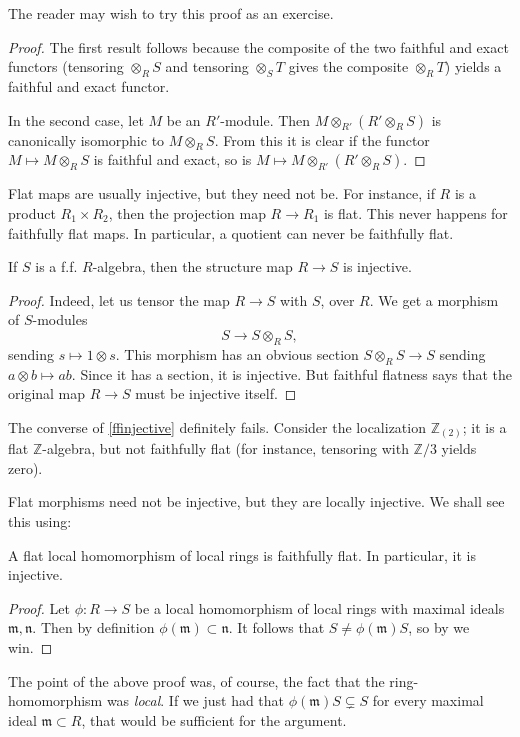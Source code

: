 The reader may wish to try this proof as an exercise.
\begin{proof} 
The first result follows because the composite of the two faithful and exact
functors (tensoring  $ \otimes_R S$ and tensoring  $ \otimes_S T$ gives the
composite $\otimes_R T$) yields a faithful and exact functor. 

In the second case, let $M$ be an $R'$-module. Then $M \otimes_{R'} (R'
\otimes_R S)$ is canonically isomorphic to $M \otimes_R S$. From this it is
clear if the functor $M \mapsto M \otimes_R S$ is faithful and
exact, so is 
$M \mapsto M \otimes_{R'} (R'
\otimes_R S)$.
\end{proof} 

Flat maps are usually injective, but they need not be. For instance, if $R$ is a
product $R_1 \times R_2$, then the projection map $R \to R_1$ is flat.
This never happens for faithfully flat maps.
In particular, a quotient can never be faithfully flat.

\begin{proposition}  \label{ffinjective}
If $S$ is a f.f. $R$-algebra, then the structure map $R \to S$ is injective.
\end{proposition} 
\begin{proof} 
Indeed, let us tensor the map $R \to S $ with $S$, over $R$. We get a morphism
of $S$-modules
\[ S \to S \otimes_R S ,  \]
sending $s \mapsto  1 \otimes s$.
This morphism has an obvious section $S \otimes_R S \to S$ sending $a \otimes b
\mapsto ab$. Since it has a section, it is injective. But faithful flatness says
that the original map $R \to S$ must be injective itself.
\end{proof} 

\begin{example} 
The converse of \cref{ffinjective} definitely fails. Consider the localization $\mathbb{Z}_{(2)}$;
it is a flat $\mathbb{Z}$-algebra, but not faithfully flat (for instance,
tensoring with $\mathbb{Z}/3$ yields zero).
\end{example} 

Flat morphisms need not be injective, but they are locally injective. We shall see this using:
\begin{proposition}  \label{flatlocal}
A flat local homomorphism of local rings is faithfully flat. In particular, it
is injective.
\end{proposition} 
\begin{proof} 
Let $\phi: R \to S$ be a local homomorphism of local rings with maximal ideals
$\mathfrak{m}, \mathfrak{n}$. Then by definition $\phi(\mathfrak{m}) \subset
\mathfrak{n}$. It follows that $S \neq \phi(\mathfrak{m})S$, so by
 we win.
\end{proof} 
The point of the above proof was, of course, the fact that the
ring-homomorphism was \emph{local}. If we just had that $\phi( \mathfrak{m})S
\subsetneq S$ for every maximal ideal $\mathfrak{m} \subset R$, that would be
sufficient for the argument.

